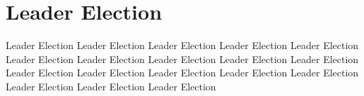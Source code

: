 \documentclass[dareport.tex]{subfiles}
\begin{document}
\section{Leader Election}
Leader Election Leader Election Leader Election
Leader Election Leader Election Leader Election
Leader Election Leader Election Leader Election
Leader Election Leader Election Leader Election
Leader Election Leader Election Leader Election
Leader Election Leader Election Leader Election
\end{document}
